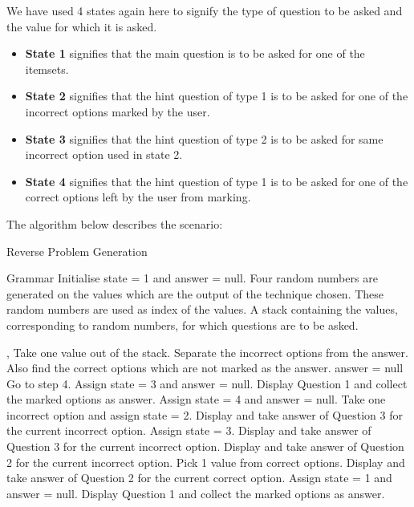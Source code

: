 We have used 4 states again here to signify the type of question to be asked and the value for which it is asked.
\begin{itemize}
\item \textbf{State 1} signifies that the main question is to be asked for one of the itemsets.
\item \textbf{State 2} signifies that the hint question of type 1 is to be asked for one of the incorrect options marked by the user.
\item \textbf{State 3} signifies that the hint question of type 2 is to be asked for same incorrect option used in state 2.
\item \textbf{State 4} signifies that the hint question of type 1 is to be asked for one of the correct options left by the user from marking.
\end{itemize}
The algorithm below describes the scenario:
\begin{algorithm}
\caption{Reverse Problem Generation}
\label{algo:Reverse Problem Generation}

\begin{algorithmic}[1]
\Require Grammar
\State Initialise state = 1 and answer = null. 
\State Four random numbers are generated on the values which are the output of the technique chosen. These random numbers are used as index of the values.
\State A stack containing the values, corresponding to random numbers, for which questions are to be asked.
\end{algorithmic}
\end{algorithm}

\begin{algorithm}                     
\begin{algorithmic} [1]
, 
\State Take one value out of the stack.
\State Separate the incorrect options from the answer.
\State Also find the correct options which are not marked as the answer.
\State answer = null
\State Go to step 4.
\Else
\State Assign state = 3 and answer = null.
\EndIf
\Else
\State Display Question 1 and collect the marked options as answer.
\EndIf
\EndIf
{}
\State Assign state = 4 and answer = null.
\Else
\State Take one incorrect option and assign state = 2.
\EndIf
\Else
\State Display and take answer of Question 3 for the current incorrect option.
\EndIf
\EndIf
{}
\State Assign state = 3.
\State Display and take answer of Question 3 for the current incorrect option.
\Else
\State Display and take answer of Question 2 for the current incorrect option.
\EndIf
\EndIf
{}
\State Pick 1 value from correct options.
\State Display and take answer of Question 2 for the current correct option.
\Else
\State Assign state = 1 and answer = null.
\State Display Question 1 and collect the marked options as answer.
\EndIf
\EndIf
\EndIf
\EndIf
\end{algorithmic}
\end{algorithm}
